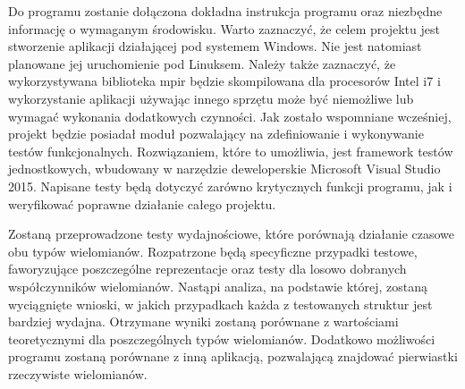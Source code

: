 Do programu zostanie dołączona dokładna instrukcja programu oraz niezbędne informację o wymaganym środowisku. Warto zaznaczyć, że celem projektu jest stworzenie aplikacji działającej pod systemem Windows. Nie jest natomiast planowane jej uruchomienie pod Linuksem. Należy także zaznaczyć, że wykorzystywana biblioteka mpir będzie skompilowana dla procesorów Intel i7 i wykorzystanie aplikacji używając innego sprzętu może być niemożliwe lub wymagać wykonania dodatkowych czynności.
Jak zostało wspomniane wcześniej, projekt będzie posiadał moduł pozwalający na zdefiniowanie i wykonywanie testów funkcjonalnych. Rozwiązaniem, które to umożliwia, jest framework testów jednostkowych, wbudowany w narzędzie deweloperskie Microsoft Visual Studio 2015. Napisane testy będą dotyczyć zarówno krytycznych funkcji programu, jak i weryfikować poprawne działanie całego projektu.

Zostaną przeprowadzone testy wydajnościowe, które porównają działanie czasowe obu typów wielomianów. Rozpatrzone będą specyficzne przypadki testowe, faworyzujące poszczególne reprezentacje oraz testy dla losowo dobranych współczynników wielomianów. Nastąpi analiza, na podstawie której, zostaną wyciągnięte wnioski, w jakich przypadkach każda z testowanych struktur jest bardziej wydajna. Otrzymane wyniki zostaną porównane z wartościami teoretycznymi dla poszczególnych typów wielomianów. Dodatkowo możliwości programu zostaną porównane z inną aplikacją, pozwalającą znajdować pierwiastki rzeczywiste wielomianów.
